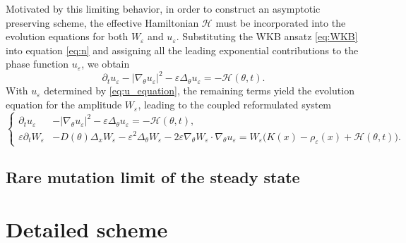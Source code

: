 \documentclass[11pt, dina4, amsfont12]{article}
\begin{document}
Motivated by this limiting behavior, in order to construct an asymptotic preserving
scheme, the effective Hamiltonian $\mathcal{H}$ must be incorporated into the evolution
equations for both $W_\varepsilon$ and $u_\varepsilon$.
Substituting the WKB ansatz \eqref{eq:WKB} into equation \eqref{eq:n} and assigning all the
leading exponential contributions to the phase function $u_\varepsilon$, we obtain 
\begin{equation}\label{eq:u_equation}
\partial_t u_\varepsilon
- |\nabla_\theta u_\varepsilon|^2
- \varepsilon \Delta_\theta u_\varepsilon
= - \mathcal{H}(\theta,t).
\end{equation}
With $u_\varepsilon$ determined by \eqref{eq:u_equation}, the remaining terms yield the evolution
equation for the amplitude $W_\varepsilon$, leading to the coupled reformulated system
\begin{equation}\label{eq:WKB_reformulation}
\left\{
\begin{aligned}
\partial_t u_\varepsilon
&- |\nabla_\theta u_\varepsilon|^2
- \varepsilon \Delta_\theta u_\varepsilon
= - \mathcal{H}(\theta,t), \\
\varepsilon \partial_t W_\varepsilon
&- D(\theta)\Delta_x W_\varepsilon
- \varepsilon^2 \Delta_\theta W_\varepsilon
- 2\varepsilon \nabla_\theta W_\varepsilon \cdot \nabla_\theta u_\varepsilon = W_\varepsilon\bigl(K(x)-\rho_\varepsilon(x) + \mathcal{H}(\theta,t)\bigr).
\end{aligned}
\right.
\end{equation}

\subsection{Rare mutation limit of the steady state}



\section{Detailed scheme}





\end{document}
